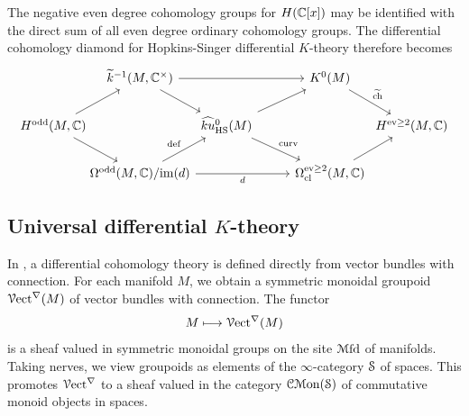 \documentclass[10pt]{amsart}
\begin{document}
The negative even degree cohomology groups for $H(\mathbb{C}[x])$ may be identified with the direct sum of all even degree ordinary cohomology groups. The differential cohomology diamond for Hopkins-Singer differential $K$-theory therefore becomes
\begin{equation*}
\begin{tikzcd}[column sep=0cm]
&[-0.2cm] 
\widetilde{k}{}^{-1}(M, \bC^\times)
\ar[dr]\ar[rr]
& &[0.9cm]
K^0(M) 
\ar[dr, "\widetilde{\ch}"] 
&
\\ 	
H^{\mathrm{odd}}(M, \bC)
\ar[ur]
\ar[dr]
& & 
\widehat{ku}{}_{\mathrm{HS}}^0(M) 
\ar[ur]
\ar[dr, "\mathrm{curv}"]
& & 
H^{\mathrm{ev} \geq 2}(M, \bC)
\\
& 
\Omega^{\mathrm{odd}}(M, \bC)/\mathrm{im}(d)
\ar[ur, "\mathrm{def}"]
\ar[rr, "d"']
& & 
\Omega_{\mathrm{cl}}^{\mathrm{ev} \geq 2}(M, \bC)
\ar[ur]
&
\end{tikzcd}
\end{equation*}


\subsection{Universal differential \texorpdfstring{$K$}{K}-theory}
In \cite{bunkenikolausvoelkl2016diffcoh}, a differential cohomology theory is defined directly from vector bundles with connection. For each manifold $M$, we obtain a symmetric monoidal groupoid $\mathcal{V}\mathrm{ect}^\nabla(M)$ of vector bundles with connection. The functor
\[
M \longmapsto \mathcal{V}\mathrm{ect}^\nabla(M)
\]
is a sheaf valued in symmetric monoidal groups on the site $\mathcal{M}\mathrm{fd}$ of manifolds. Taking nerves, we view groupoids as elements of the $\infty$-category $\mathcal{S}$ of spaces. This promotes $\mathcal{V}\mathrm{ect}^\nabla$ to a sheaf valued in the category $\mathcal{C}\mathcal{M}\mathrm{on}(\mathcal{S})$ of commutative monoid objects in spaces.
\end{document}
